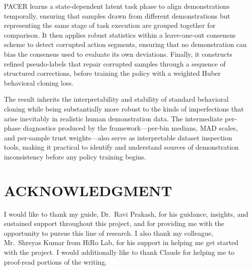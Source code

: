 \documentclass[a4paper, 10pt, conference]{ieeeconf}
\begin{document}
PACER learns a state-dependent latent task phase to align demonstrations temporally, ensuring that samples drawn from different demonstrations but representing the same stage of task execution are grouped together for comparison.
It then applies robust statistics within a leave-one-out consensus scheme to detect corrupted action segments, ensuring that no demonstration can bias the consensus used to evaluate its own deviations.
Finally, it constructs refined pseudo-labels that repair corrupted samples through a sequence of structured corrections, before training the policy with a weighted Huber behavioral cloning loss.

The result inherits the interpretability and stability of standard behavioral cloning while being substantially more robust to the kinds of imperfections that arise inevitably in realistic human demonstration data.
The intermediate per-phase diagnostics produced by the framework---per-bin medians, MAD scales, and per-sample trust weights---also serve as interpretable dataset inspection tools, making it practical to identify and understand sources of demonstration inconsistency before any policy training begins.

\addtolength{\textheight}{-12cm}

\section*{ACKNOWLEDGMENT}

I would like to thank my guide, Dr.~Ravi Prakash, for his guidance, insights, and sustained support throughout this project, and for providing me with the opportunity to pursue this line of research.
I also thank my colleague, Mr.~Shreyas Kumar from HiRo Lab, for his support in helping me get started with the project.
I would additionally like to thank Claude for helping me to proof-read portions of the writing.

\end{document}
